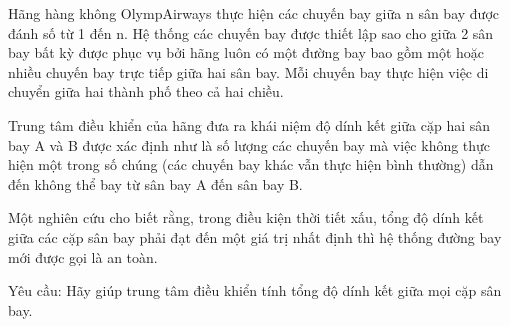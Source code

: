 Hãng hàng không OlympAirways thực hiện các chuyến bay giữa n sân bay được đánh số từ 1 đến n. Hệ thống các chuyến bay được thiết lập sao cho giữa 2 sân bay bất kỳ được   phục vụ bởi hãng luôn có một đường bay bao gồm một hoặc nhiều chuyến bay trực tiếp giữa hai sân bay. Mỗi chuyến bay thực hiện việc di chuyển giữa   hai thành phố theo cả hai chiều.  

   Trung tâm điều khiển của hãng đưa ra khái niệm độ dính kết giữa cặp hai sân bay A và B được xác định như là số lượng các chuyến bay mà việc không thực hiện một trong số chúng (các chuyến bay khác   vẫn thực hiện bình thường) dẫn đến không thể bay từ sân bay A đến sân bay B.  

   Một nghiên cứu cho biết rằng, trong điều kiện thời tiết xấu, tổng độ dính kết giữa các cặp sân bay phải đạt đến một giá trị nhất định thì hệ thống đường bay mới được gọi là an toàn.  

   Yêu cầu: Hãy giúp trung tâm điều khiển tính tổng độ dính kết giữa mọi cặp sân bay.